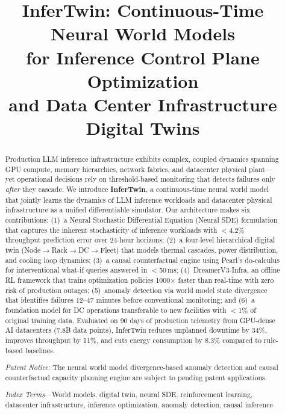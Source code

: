 \documentclass[conference,10pt]{IEEEtran}
\begin{document}
\title{InferTwin: Continuous-Time Neural World Models\\for Inference Control Plane Optimization\\and Data Center Infrastructure Digital Twins}
\author{
}
\maketitle
\begin{abstract}
Production LLM inference infrastructure exhibits complex, coupled dynamics spanning GPU compute, memory hierarchies, network fabrics, and datacenter physical plant---yet operational decisions rely on threshold-based monitoring that detects failures only \emph{after} they cascade. We introduce \textbf{InferTwin}, a continuous-time neural world model that jointly learns the dynamics of LLM inference workloads and datacenter physical infrastructure as a unified differentiable simulator. Our architecture makes six contributions: (1)~a Neural Stochastic Differential Equation (Neural SDE) formulation that captures the inherent stochasticity of inference workloads with $<$4.2\% throughput prediction error over 24-hour horizons; (2)~a four-level hierarchical digital twin (Node$\to$Rack$\to$DC$\to$Fleet) that models thermal cascades, power distribution, and cooling loop dynamics; (3)~a causal counterfactual engine using Pearl's do-calculus for interventional what-if queries answered in $<$50\,ms; (4)~DreamerV3-Infra, an offline RL framework that trains optimization policies 1000$\times$ faster than real-time with zero risk of production outages; (5)~anomaly detection via world model state divergence that identifies failures 12--47 minutes before conventional monitoring; and (6)~a foundation model for DC operations transferable to new facilities with $<$1\% of original training data. Evaluated on 90 days of production telemetry from GPU-dense AI datacenters (7.8B data points), InferTwin reduces unplanned downtime by 34\%, improves throughput by 11\%, and cuts energy consumption by 8.3\% compared to rule-based baselines.

\emph{Patent Notice}: The neural world model divergence-based anomaly detection and causal counterfactual capacity planning engine are subject to pending patent applications.

\emph{Index Terms}---World models, digital twin, neural SDE, reinforcement learning, datacenter infrastructure, inference optimization, anomaly detection, causal inference
\end{abstract}
\end{document}
